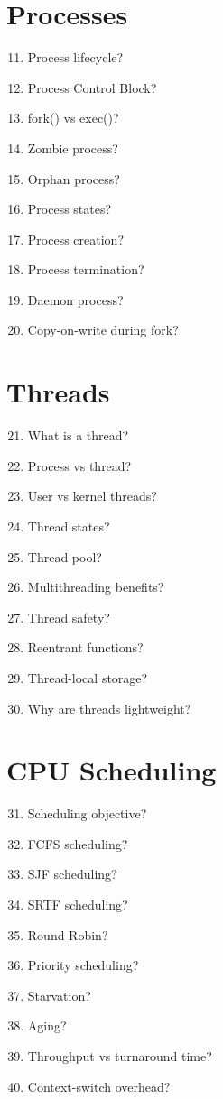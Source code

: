 \section{Processes}

\begin{enumerate}
\setcounter{enumi}{10}
\item Process lifecycle?
\item Process Control Block?
\item fork() vs exec()?
\item Zombie process?
\item Orphan process?
\item Process states?
\item Process creation?
\item Process termination?
\item Daemon process?
\item Copy-on-write during fork?
\end{enumerate}

\section{Threads}

\begin{enumerate}
\setcounter{enumi}{20}
\item What is a thread?
\item Process vs thread?
\item User vs kernel threads?
\item Thread states?
\item Thread pool?
\item Multithreading benefits?
\item Thread safety?
\item Reentrant functions?
\item Thread-local storage?
\item Why are threads lightweight?
\end{enumerate}

\section{CPU Scheduling}

\begin{enumerate}
\setcounter{enumi}{30}
\item Scheduling objective?
\item FCFS scheduling?
\item SJF scheduling?
\item SRTF scheduling?
\item Round Robin?
\item Priority scheduling?
\item Starvation?
\item Aging?
\item Throughput vs turnaround time?
\item Context-switch overhead?
\end{enumerate}

